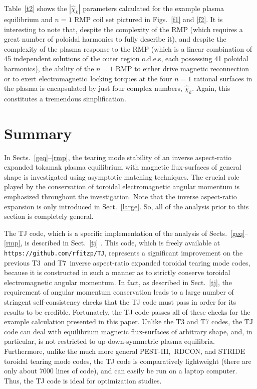 \documentclass[12pt,prb,aps]{revtex4-1}
\begin{document}
Table~\ref{t2} shows the $|\hat{\chi}_k|$ parameters calculated for the example plasma equilibrium and $n=1$ RMP coil
set pictured in Figs.~\ref{f1} and \ref{f2}. It is interesting to note that, despite the complexity of the RMP (which requires a great number of
poloidal harmonics to fully describe it), and despite the
complexity of the plasma response to the RMP (which is a linear combination of 45 independent solutions of the
outer region o.d.e.s, each possessing 41 poloidal harmonics), the ability of the $n=1$ RMP to either drive magnetic reconnection or to exert electromagnetic\
locking torques at the four $n=1$ rational surfaces in the plasma is encapsulated by just four complex numbers, $\hat{\chi}_k$. 
Again,
this constitutes a tremendous simplification. 
\fi
  
\section{Summary}\label{sum}
In Sects.~\ref{geq}--\ref{rmp}, the tearing mode stability of an inverse aspect-ratio expanded tokamak plasma equilibrium  with magnetic flux-surfaces of general 
shape is investigated using asymptotic matching techniques. The crucial role played by the conservation of
toroidal electromagnetic angular momentum is emphasized throughout the investigation. Note that the inverse aspect-ratio
expansion is only introduced in Sect.~\ref{large}. So, all of the analysis prior to this section is completely general. 

\iffalse
The TJ code,
which is a specific implementation of the analysis of Sects.~\ref{geq}--\ref{rmp}, is described in Sect.~\ref{tj}
. This code, which is
freely available at {\tt https://github.com/rfitzp/TJ}, represents a significant improvement on the previous T3\,\cite{connor} and T7\,\cite{am1} inverse aspect-ratio expanded toroidal tearing mode
codes, because it is constructed in such a manner as to strictly conserve toroidal electromagnetic
angular momentum. In fact, as described in Sect.~\ref{tj}, the requirement of angular momentum conservation leads to a large number of
stringent self-consistency checks that the TJ code must pass in order for its results to be credible. Fortunately, the TJ code passes all of these
checks for the example calculation presented in this paper. 
Unlike the T3 and T7 codes, the TJ code can deal with equilibrium magnetic flux-surfaces of arbitrary shape, and, in particular, 
is not restricted to up-down-symmetric  plasma equilibria. Furthermore, unlike the much more general  PEST-III,\,\cite{pletz1} RDCON,\cite{aglas2} and STRIDE\,\cite{aglas1} toroidal
tearing mode codes, the TJ code is comparatively lightweight (there are only about 7000 lines of code), and can easily be run on a laptop computer. Thus, the TJ code is ideal for
optimization studies. 
\end{document}
